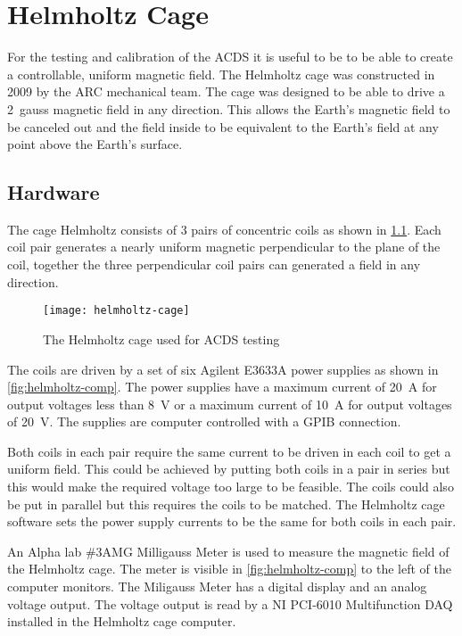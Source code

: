 

\chapter{Helmholtz Cage}

\label{ch:Helmholtz}

For the testing and calibration of the \ac{ACDS} it is useful to be to be able to create a controllable, uniform magnetic field. The Helmholtz cage was constructed in 2009 by the \ac{ARC} mechanical team. The cage was designed to be able to drive a 2~gauss magnetic field in any direction. This allows the Earth's magnetic field to be canceled out and the field inside to be equivalent to the Earth's field at any point above the Earth's surface.

\section{Hardware}

The cage Helmholtz consists of 3 pairs of concentric coils as shown in \cref{fig:helmholtz}. Each coil pair generates a nearly uniform magnetic perpendicular to the plane of the coil, together the three perpendicular coil pairs can generated a field in any direction.

\begin{figure}[!ht]
    \texttt{[image: helmholtz-cage]}
    \caption{The Helmholtz cage used for \acs{ACDS} testing}
    \label{fig:helmholtz}
\end{figure}

The coils are driven by a set of six Agilent E3633A power supplies as shown in \cref{fig:helmholtz-comp}. The power supplies have a maximum current of 20~A for output voltages less than 8~V or a maximum current of 10~A for output voltages of 20~V. The supplies are computer controlled with a \ac{GPIB} connection. 

Both coils in each pair require the same current to be driven in each coil to get a uniform field. This could be achieved by putting both coils in a pair in series but this would make the required voltage too large to be feasible. The coils could also be put in parallel but this requires the coils to be matched. The Helmholtz cage software sets the power supply currents to be the same for both coils in each pair.

An Alpha lab \#3AMG Milligauss Meter is used to measure the magnetic field of the Helmholtz cage. The meter is visible in \cref{fig:helmholtz-comp} to the left of the computer monitors. The Miligauss Meter has a digital display and an analog voltage output. The voltage output is read by a NI PCI-6010 Multifunction \ac{DAQ} installed in the Helmholtz cage computer.

